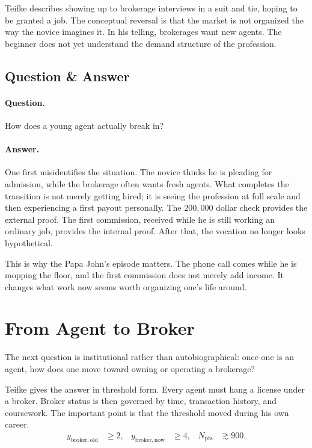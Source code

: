 Teifke describes showing up to brokerage interviews in a suit and tie, hoping to be granted a job. The conceptual reversal is that the market is not organized the way the novice imagines it. In his telling, brokerages want new agents. The beginner does not yet understand the demand structure of the profession.

\subsection{Question \& Answer}

\paragraph{Question.} How does a young agent actually break in?

\paragraph{Answer.} One first misidentifies the situation. The novice thinks he is pleading for admission, while the brokerage often wants fresh agents. What completes the transition is not merely getting hired; it is seeing the profession at full scale and then experiencing a first payout personally. The \(200{,}000\) dollar check provides the external proof. The first commission, received while he is still working an ordinary job, provides the internal proof. After that, the vocation no longer looks hypothetical.

This is why the Papa John's episode matters. The phone call comes while he is mopping the floor, and the first commission does not merely add income. It changes what work now seems worth organizing one's life around.

\section{From Agent to Broker}

The next question is institutional rather than autobiographical: once one is an agent, how does one move toward owning or operating a brokerage?

Teifke gives the answer in threshold form. Every agent must hang a license under a broker. Broker status is then governed by time, transaction history, and coursework. The important point is that the threshold moved during his own career.
\begin{align}
y_{\mathrm{broker,old}} &\ge 2,
&
y_{\mathrm{broker,now}} &\ge 4,
&
N_{\mathrm{pts}} &\gtrsim 900.
\end{align}

